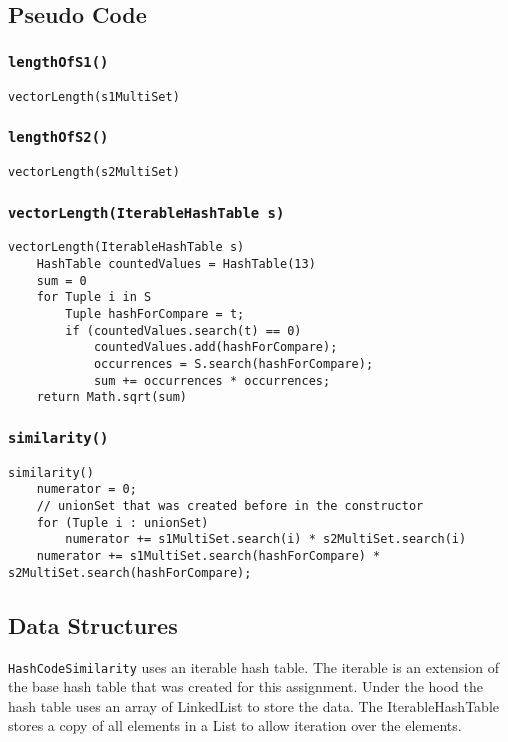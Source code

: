 \documentclass[10pt,letterpaper]{article}
\begin{document}
\subsection{Pseudo Code}
\subsubsection{\texttt{lengthOfS1()}}
\begin{verbatim}
vectorLength(s1MultiSet)
\end{verbatim}
\subsubsection{\texttt{lengthOfS2()}}
\begin{verbatim}
vectorLength(s2MultiSet)
\end{verbatim}
\subsubsection{\texttt{vectorLength(IterableHashTable s)}}
\begin{verbatim}
vectorLength(IterableHashTable s)
    HashTable countedValues = HashTable(13)
    sum = 0
    for Tuple i in S
        Tuple hashForCompare = t;
        if (countedValues.search(t) == 0)
            countedValues.add(hashForCompare);
            occurrences = S.search(hashForCompare);
            sum += occurrences * occurrences;
    return Math.sqrt(sum)
\end{verbatim}
\subsubsection{\texttt{similarity()}}
\begin{verbatim}
similarity()
    numerator = 0;
    // unionSet that was created before in the constructor
    for (Tuple i : unionSet)
        numerator += s1MultiSet.search(i) * s2MultiSet.search(i)
    numerator += s1MultiSet.search(hashForCompare) * s2MultiSet.search(hashForCompare);
\end{verbatim}
\subsection{Data Structures}
\texttt{HashCodeSimilarity} uses an iterable hash table. The iterable is an extension of the base hash table that was
created for this assignment. Under the hood the hash table uses an array of LinkedList to store the data. The
IterableHashTable stores a copy of all elements in a List to allow iteration over the elements.
\end{document}
